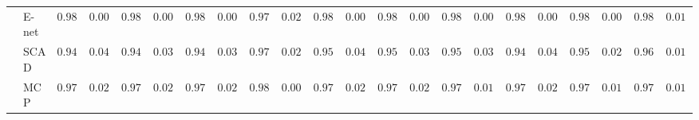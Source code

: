 \begin{tabular}{ll|ll|llllll|llllll|llllll}
 & E-net  & $0.9893$ & $0.0021$ & $0.9894$ & $0.0011$ & $0.9862$ & $0.0099$ & $0.9725$ & $0.0243$ & $0.9895$ & $0.0000$ & $0.9888$ & $0.0044$ & $0.9863$ & $0.0068$ & $0.9892$ & $0.0023$ & $0.9883$ & $0.0039$ & $0.9815$ & $0.0149$ \\
 & SCAD  & $0.9491$ & $0.0470$ & $0.9448$ & $0.0376$ & $0.9458$ & $0.0304$ & $0.9700$ & $0.0205$ & $0.9509$ & $0.0411$ & $0.9557$ & $0.0383$ & $0.9596$ & $0.0302$ & $0.9471$ & $0.0411$ & $0.9536$ & $0.0244$ & $0.9667$ & $0.0176$ \\
 & MCP  & $0.9726$ & $0.0254$ & $0.9723$ & $0.0220$ & $0.9734$ & $0.0200$ & $0.9815$ & $0.0070$ & $0.9746$ & $0.0221$ & $0.9759$ & $0.0203$ & $0.9758$ & $0.0175$ & $0.9735$ & $0.0233$ & $0.9772$ & $0.0133$ & $0.9763$ & $0.0137$ \\
\hline 
\end{tabular}

